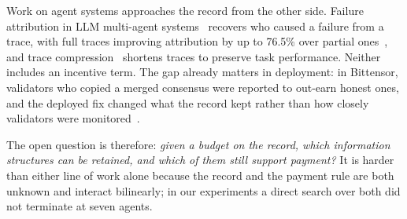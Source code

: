\documentclass[sigconf,anonymous,acmthm=false]{aamas}
\theoremstyle{acmplain}
\theoremstyle{acmdefinition}
\begin{document}
Work on agent systems approaches the record from the other side. Failure attribution in
LLM multi-agent systems~\cite{zhang2025which,zhang2025agentracer,cemri2025fail} recovers who
caused a failure from a trace, with full traces improving attribution by up to 76.5\% over
partial ones~\cite{chen2026elephant}, and trace compression~\cite{hong2026trace,lin2026tracer}
shortens traces to preserve task performance. Neither includes an incentive term. The gap
already matters in deployment: in Bittensor, validators who copied a merged consensus were
reported to out-earn honest ones, and the deployed fix changed what the record kept rather
than how closely validators were
monitored~\cite{opentensor2024weightcopy,liu2024bittensor,opentensor2025commit}.

The open question is therefore: \emph{given a budget on the record, which information
structures can be retained, and which of them still support payment?} It is harder than
either line of work alone because the record and the payment rule are both unknown and
interact bilinearly; in our experiments a direct search over both did not terminate at
seven agents.
\end{document}
